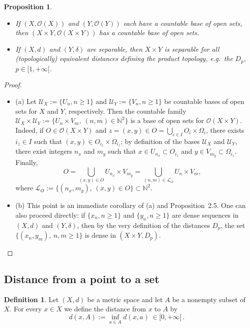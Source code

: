 \documentclass[12pt]{article}
\newtheorem{proposition}{Proposition}[section]
\theoremstyle{definition}
\newtheorem{definition}{Definition}[section]
\begin{document}
\begin{proposition}
\begin{itemize}[leftmargin=1.5em]
\item[(a)] If $(X,\mathcal{O}(X))$ and $(Y,\mathcal{O}(Y))$ each have a countable base of open sets, then $(X\times Y,\mathcal{O}(X\times Y))$ has a countable base of open sets.
\item[(b)] If $(X,d)$ and $(Y,\delta)$ are separable, then $X\times Y$ is separable for all (topologically) equivalent distances defining the product topology, e.g.\ the $D_p$, $p\in[1,+\infty[$.
\end{itemize}
\end{proposition}

\begin{proof}
\begin{itemize}
\item (a) Let $\mathcal{U}_X:=\{U_n, n\ge 1\}$ and $\mathcal{U}_Y:=\{V_n, n\ge 1\}$ be countable bases of open sets for $X$ and $Y$, respectively.
Then the countable family $\mathcal{U}_X\times\mathcal{U}_Y:=\{U_n\times V_m,\ (n,m)\in\mathbb{N}^2\}$ is a base of open sets for $\mathcal{O}(X\times Y)$.
Indeed, if $O\in\mathcal{O}(X\times Y)$ and $z=(x,y)\in O=\bigcup_{i\in I} O_i\times\Omega_i$, there exists $i_z\in I$ such that $(x,y)\in O_{i_z}\times\Omega_{i_z}$; by definition of the bases $\mathcal{U}_X$ and $\mathcal{U}_Y$, there exist integers $n_x$ and $m_y$ such that $x\in U_{n_x}\subset O_{i_z}$ and $y\in V_{m_y}\subset \Omega_{i_z}$.
Finally,
\[
O=\bigcup_{(x,y)\in O} U_{n_x}\times V_{m_y}=\bigcup_{(n,m)\in\mathcal{L}_O} U_n\times V_m,
\]
where $\mathcal{L}_O:=\{(n_x,m_y),\ (x,y)\in O\}\subset\mathbb{N}^2$.

\item (b) This point is an immediate corollary of (a) and Proposition~2.5.
One can also proceed directly: if $\{x_n, n\ge 1\}$ and $\{y_n, n\ge 1\}$ are dense sequences in $(X,d)$ and $(Y,\delta)$, then by the very definition of the distances $D_p$, the set $\{(x_n,y_m),\ n,m\ge 1\}$ is dense in $(X\times Y, D_p)$.
\end{itemize}
\end{proof}

\subsection{Distance from a point to a set}

\begin{definition}
Let $(X,d)$ be a metric space and let $A$ be a nonempty subset of $X$.
For every $x\in X$ we define the distance from $x$ to $A$ by
\[
d(x,A):=\inf_{a\in A} d(x,a)\ \in [0,+\infty[\, .
\]
\end{definition}
\end{document}
